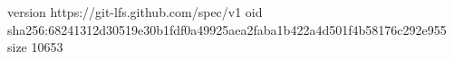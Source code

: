version https://git-lfs.github.com/spec/v1
oid sha256:68241312d30519e30b1fdf0a49925aea2faba1b422a4d501f4b58176c292e955
size 10653
